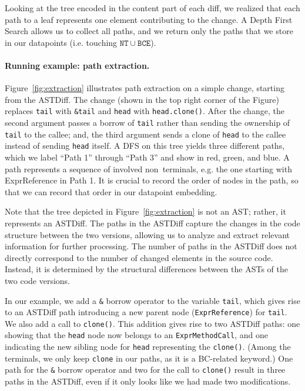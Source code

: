 Looking at the tree encoded in the content part of each diff, we realized that each path to a leaf represents one element contributing to the change. A Depth First Search allows us to collect all paths, and we return only the paths that we store in our datapoints (i.e. touching $\mathtt{NT} \cup \mathtt{BCE}$).

\paragraph{Running example: path extraction.} Figure~\ref{fig:extraction} illustrates path extraction on a simple change, starting from the ASTDiff. The change (shown in the top right corner of the Figure) replaces \verb+tail+ with \verb+&tail+ and \verb+head+ with \verb+head.clone()+. After the change, the second argument passes a borrow of \verb+tail+ rather than sending the ownership of \verb+tail+ to the callee; and, the third argument sends a clone of \verb+head+ to the callee instead of sending \verb+head+ itself. A DFS on this tree yields three different paths, which we label ``Path 1'' through ``Path 3'' and show in red, green, and blue. A path represents a sequence of involved non~terminals, e.g. the one starting with ExprReference in Path 1. It is crucial to record the order of nodes in the path, so that we can record that order in our datapoint embedding.

Note that the tree depicted in Figure~\ref{fig:extraction} is not an AST; rather, it represents an ASTDiff. The paths in the ASTDiff capture the changes in the code structure between the two versions, allowing us to analyze and extract relevant information for further processing. The number of paths in the ASTDiff does not directly correspond to the number of changed elements in the source code. Instead, it is determined by the structural differences between the ASTs of the two code versions.

In our example, we add a \verb+&+ borrow operator to the variable \verb+tail+, which gives rise to an ASTDiff path introducing a new parent node (\verb+ExprReference+) for \verb+tail+. We also add a call to \verb+clone()+. This addition gives rise to two ASTDiff paths: one showing that the \verb+head+ node now belongs to an \verb+ExprMethodCall+, and one indicating the new sibling node for \verb+head+ representing the \verb+clone()+. (Among the terminals, we only keep \verb+clone+ in our paths, as it is a BC-related keyword.) One path for the \verb+&+ borrow operator and two for the call to \verb+clone()+ result in three paths in the ASTDiff, even if it only looks like we had made two modifications.

